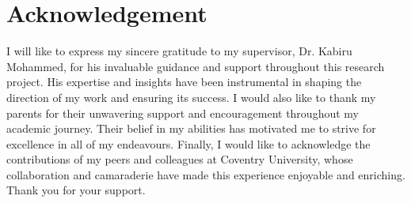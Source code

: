 \chapter*{\Large \center Acknowledgement}

\noindent I will like to express my sincere gratitude to my supervisor, Dr. Kabiru Mohammed, for his invaluable guidance and support throughout this research project. His expertise and insights have been instrumental in shaping the direction of my work and ensuring its success. I would also like to thank my parents for their unwavering support and encouragement throughout my academic journey. Their belief in my abilities has motivated me to strive for excellence in all of my endeavours. Finally, I would like to acknowledge the contributions of my peers and colleagues at Coventry University, whose collaboration and camaraderie have made this experience enjoyable and enriching. Thank you for your support.
